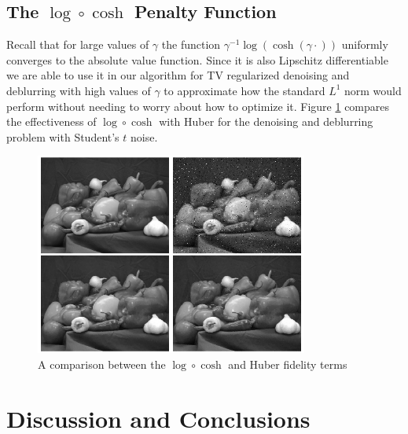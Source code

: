 \documentclass[10pt,a4paper]{article}
\begin{document}
	\subsection{The $\log \circ \cosh$ Penalty Function}
	
	Recall that for large values of $\gamma$ the function $\gamma^{-1} \log(\cosh (\gamma \cdot ))$ uniformly converges to the absolute value function.  Since it is also Lipschitz differentiable we are able to use it in our algorithm for TV regularized denoising and deblurring with high values of $\gamma$ to approximate how the standard $L^1$ norm would perform without needing to worry about how to optimize it.  Figure \ref{log_cosh_pic}
compares the effectiveness of $\log \circ \cosh$ with Huber for the denoising and deblurring problem with Student's $t$ noise.
	
	\begin{figure}[H]
		\begin{center}
			\includegraphics[width=0.8\textwidth]{../figures/logcosh_peppers.png}
			\caption{A comparison between the $\log \circ \cosh$ and Huber fidelity terms }
			\label{log_cosh_pic}
		\end{center}
	\end{figure}
	
	\section{Discussion and Conclusions}
	
\end{document}
